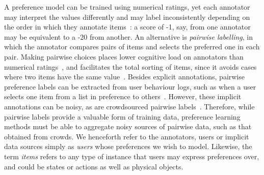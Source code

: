 A preference model can be trained using numerical ratings, yet 
each annotator may interpret the values differently and may label inconsistently depending on the order in which they annotate items~\citep{ovadia2004ratings,yannakakis2011ranking}: 
a score of -1, say, from one annotator may be equivalent to a -20 from another. 
An alternative is \emph{pairwise labelling}, 
in which the annotator compares pairs of items and selects the preferred one in each pair.
Making pairwise choices places lower cognitive load on annotators than numerical ratings~\citep{yang2011ranking},
and facilitates the total sorting of items, since it avoids cases where two items have the same value~\citep{kendall1948rank,kingsley2010preference}.
Besides explicit annotations, pairwise preference labels can be extracted from
user behaviour logs, such as when a user selects one item from a list in preference
to others~\citep{joachims2002optimizing}. 
However, these implicit annotations can be noisy, as are crowdsourced pairwise labels~\citep{habernal2016argument}.
Therefore, while pairwise labels provide a valuable
form of training data, preference learning methods must be able to 
aggregate noisy sources of pairwise data, such as that obtained from crowds.
We henceforth refer to the annotators, users or implicit data sources simply as \emph{users}
whose preferences we wish to model.
Likewise, the term \emph{items} refers to any type of instance that users may express preferences over,
and could be states or actions as well as physical objects.

